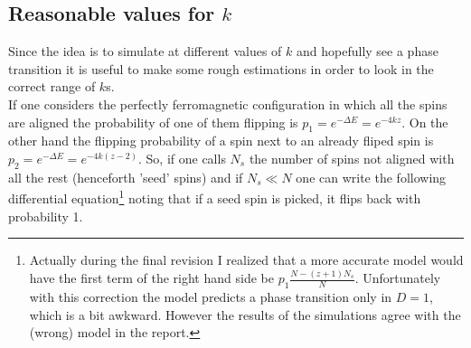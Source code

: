 \documentclass[a4paper, 11pt]{article}
\begin{document}


    \subsection{Reasonable values for $k$}
      Since the idea is to simulate at different values of $k$ and hopefully see a phase transition it is useful to make some rough estimations in order to look in the correct range of $k$s.\\
      If one considers the perfectly ferromagnetic configuration in which all the spins are aligned the probability of one of them flipping is $p_1 = e^{-\Delta E} = e^{-4kz}$.
      On the other hand the flipping probability of a spin next to an already fliped spin is $p_2 = e^{-\Delta E} = e^{-4k(z-2)}$.
      So, if one calls $N_{s}$ the number of spins not aligned with all the rest (henceforth 'seed' spins) and if $N_{s} \ll N$ one can write the following differential equation\footnote{Actually during the final revision I realized that a more accurate model would have the first term of the right hand side be $p_1\frac{N - (z+1)N_s}{N}$. Unfortunately with this correction the model predicts a phase transition only in $D = 1$, which is a bit awkward. However the results of the simulations agree with the (wrong) model in the report.}
      noting that if a seed spin is picked, it flips back with probability 1.
\end{document}

